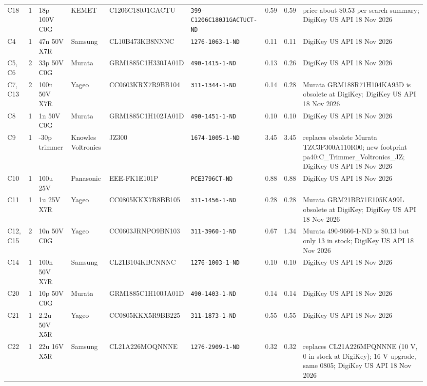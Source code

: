 \begin{longtable}{@{}p{1.8cm}r >{\raggedright\arraybackslash}p{2.3cm} >{\raggedright\arraybackslash}p{1.9cm} p{3.7cm} p{4.4cm} r r >{\raggedright\arraybackslash}p{3.9cm}@{}}
C18 & 1 & 18p 100V C0G & KEMET & C1206C180J1GACTU & \texttt{\footnotesize 399-C1206C180J1GACTUCT-ND} & 0.59 & 0.59 & price about \$0.53 per search summary; DigiKey US API 18 Nov 2026\\
C4 & 1 & 47n 50V X7R & Samsung & CL10B473KB8NNNC & \texttt{\footnotesize 1276-1063-1-ND} & 0.11 & 0.11 & DigiKey US API 18 Nov 2026\\
C5, C6 & 2 & 33p 50V C0G & Murata & GRM1885C1H330JA01D & \texttt{\footnotesize 490-1415-1-ND} & 0.13 & 0.26 & DigiKey US API 18 Nov 2026\\
C7, C13 & 2 & 100n 50V X7R & Yageo & CC0603KRX7R9BB104 & \texttt{\footnotesize 311-1344-1-ND} & 0.14 & 0.28 & Murata GRM188R71H104KA93D is obsolete at DigiKey; DigiKey US API 18 Nov 2026\\
C8 & 1 & 1n 50V C0G & Murata & GRM1885C1H102JA01D & \texttt{\footnotesize 490-1451-1-ND} & 0.10 & 0.10 & DigiKey US API 18 Nov 2026\\
C9 & 1 & 5.5-30p trimmer & Knowles Voltronics & JZ300 & \texttt{\footnotesize 1674-1005-1-ND} & 3.45 & 3.45 & replaces obsolete Murata TZC3P300A110R00; new footprint pa40:C\_\allowbreak{}Trimmer\_\allowbreak{}Voltronics\_\allowbreak{}JZ; DigiKey US API 18 Nov 2026\\
C10 & 1 & 100u 25V & Panasonic & EEE-FK1E101P & \texttt{\footnotesize PCE3796CT-ND} & 0.88 & 0.88 & DigiKey US API 18 Nov 2026\\
C11 & 1 & 1u 25V X7R & Yageo & CC0805KKX7R8BB105 & \texttt{\footnotesize 311-1456-1-ND} & 0.28 & 0.28 & Murata GRM21BR71E105KA99L obsolete at DigiKey; DigiKey US API 18 Nov 2026\\
C12, C15 & 2 & 10n 50V C0G & Yageo & CC0603JRNPO9BN103 & \texttt{\footnotesize 311-3960-1-ND} & 0.67 & 1.34 & Murata 490-9666-1-ND is \$0.13 but only 13 in stock; DigiKey US API 18 Nov 2026\\
C14 & 1 & 100n 50V X7R & Samsung & CL21B104KBCNNNC & \texttt{\footnotesize 1276-1003-1-ND} & 0.10 & 0.10 & DigiKey US API 18 Nov 2026\\
C20 & 1 & 10p 50V C0G & Murata & GRM1885C1H100JA01D & \texttt{\footnotesize 490-1403-1-ND} & 0.14 & 0.14 & DigiKey US API 18 Nov 2026\\
C21 & 1 & 2.2u 50V X5R & Yageo & CC0805KKX5R9BB225 & \texttt{\footnotesize 311-1873-1-ND} & 0.55 & 0.55 & DigiKey US API 18 Nov 2026\\
C22 & 1 & 22u 16V X5R & Samsung & CL21A226MOQNNNE & \texttt{\footnotesize 1276-2909-1-ND} & 0.32 & 0.32 & replaces CL21A226MPQNNNE (10 V, 0 in stock at DigiKey); 16 V upgrade, same 0805; DigiKey US API 18 Nov 2026\\

\end{longtable}
